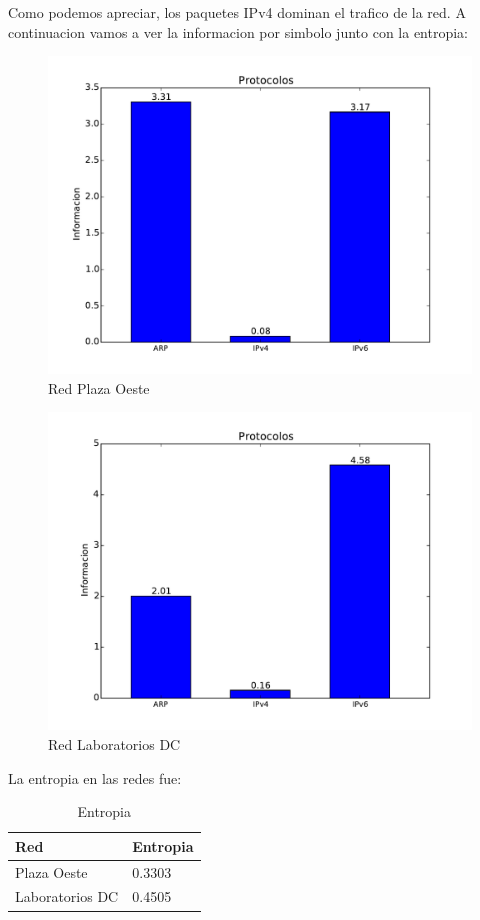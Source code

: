 \pagebreak

Como podemos apreciar, los paquetes IPv4 dominan el trafico de la red. A continuacion vamos a ver la informacion por simbolo junto con la entropia:

\begin{figure}[ht]
\begin{center}
\includegraphics[width=0.6\columnwidth]{graficos/plaza_inf_s1.pdf}
\caption{Red Plaza Oeste}
\end{center}
\end{figure}

\begin{figure}[ht]
\begin{center}
\includegraphics[width=0.8\columnwidth]{graficos/dc_inf_s1.pdf}
\caption{Red Laboratorios DC}
\end{center}
\end{figure}

\pagebreak

La entropia en las redes fue:

\begin{table}[ht]
\centering
\caption{Entropia}
\label{my-label}
\begin{tabular}{ll}
\hline
Red         & Entropia \\ \hline
Plaza Oeste & 0.3303   \\
Laboratorios DC    & 0.4505   \\ \hline
\end{tabular}
\end{table}

